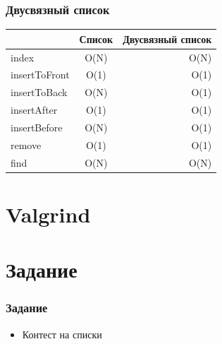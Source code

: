 \documentclass[12pt,pdf,hyperref={unicode}]{beamer}
\begin{document}
\begin{frame}[fragile]
\frametitle{Двусвязный список}
\begin{center}
  \begin{tabular}{  l | c r }
      & Список & Двусвязный список \\
    \hline
    index & O(N) &  O(N) \\
    insertToFront & O(1) & O(1) \\
    insertToBack & O(N) & O(1) \\
    insertAfter & O(1) & O(1) \\
    insertBefore & O(N) & O(1) \\
    remove & O(1) & O(1) \\
    find & O(N) & O(N) \\
    \hline
  \end{tabular}
\end{center}
\end{frame}



\section{Valgrind}




\section{Задание}

\begin{frame}[fragile]
\frametitle{Задание} 
\begin{itemize}
\item Контест на списки
\end{itemize}
\end{frame}
\end{document}
